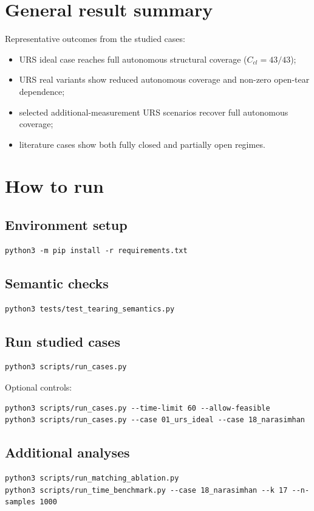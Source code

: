 \documentclass[11pt]{article}
\begin{document}
\section{General result summary}
Representative outcomes from the studied cases:
\begin{itemize}
  \item URS ideal case reaches full autonomous structural coverage
  ($C_{cl}=43/43$);
  \item URS real variants show reduced autonomous coverage and non-zero
  open-tear dependence;
  \item selected additional-measurement URS scenarios recover full
  autonomous coverage;
  \item literature cases show both fully closed and partially open regimes.
\end{itemize}

\section{How to run}
\subsection{Environment setup}
\begin{verbatim}
python3 -m pip install -r requirements.txt
\end{verbatim}

\subsection{Semantic checks}
\begin{verbatim}
python3 tests/test_tearing_semantics.py
\end{verbatim}

\subsection{Run studied cases}
\begin{verbatim}
python3 scripts/run_cases.py
\end{verbatim}

Optional controls:
\begin{verbatim}
python3 scripts/run_cases.py --time-limit 60 --allow-feasible
python3 scripts/run_cases.py --case 01_urs_ideal --case 18_narasimhan
\end{verbatim}

\subsection{Additional analyses}
\begin{verbatim}
python3 scripts/run_matching_ablation.py
python3 scripts/run_time_benchmark.py --case 18_narasimhan --k 17 --n-samples 1000
\end{verbatim}
\end{document}
